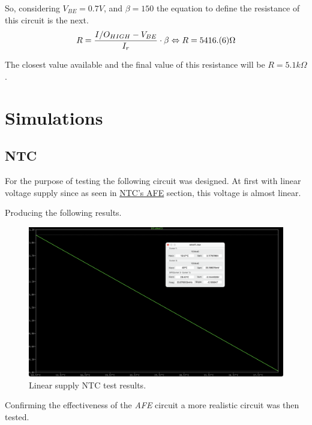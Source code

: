 \documentclass[12pt]{article}
\begin{document}
    So, considering $V_{BE} = 0.7V$, and $\beta = 150$ the equation to define the resistance of this circuit is the next.
    \begin{equation}
        R = \frac{I/O_{HIGH}-V_{BE}}{I_r}\cdot \beta\\
        \Leftrightarrow R = 5416.(6) \Omega
    \end{equation}

    The closest value available and the final value of this resistance will be $R = 5.1 k\Omega$.
\newpage
\section{Simulations}
\subsection{NTC}
    
    For the purpose of testing the following circuit was designed.
    At first with linear voltage supply since as seen in \hyperref[AFENTCOutV]{NTC's AFE} section, this voltage is almost linear.

    Producing the following results.
 
    \begin{figure}[H] 
        \centering
        \includegraphics*[scale = 0.3]{images/NTCLinearRes.png}
        \caption{Linear supply NTC test results.}
        \label{wrap-fig:1}
    \end{figure}

    Confirming the effectiveness of the \textit{AFE} circuit a more realistic
    circuit was then tested.
\end{document}
